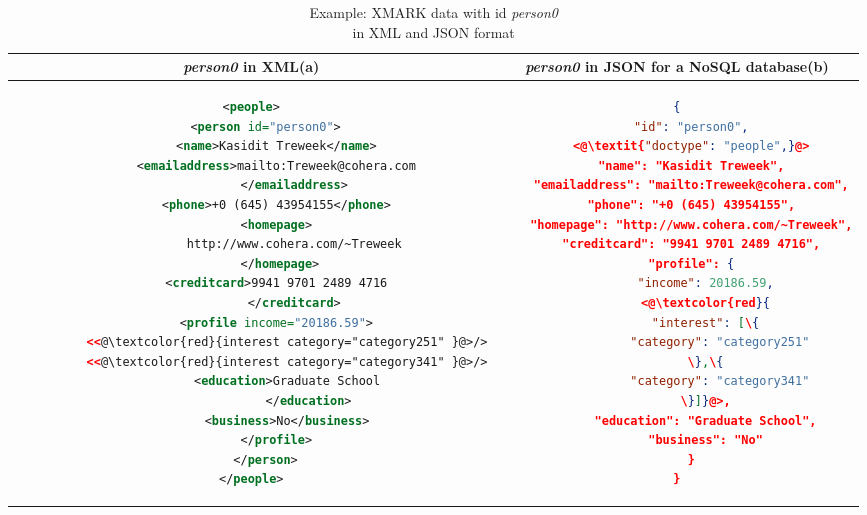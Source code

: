 \begin{longtable}{c|c}
	\caption{Example: XMARK data with id \textit{person0} \\in XML and JSON format }
	\label{tbl:xmark-xml-json}\\
	{\textit{person0}} in XML(a) & {\textit{person0}} in JSON for a NoSQL database(b)\\
	\hline
	\begin{minipage}{.4\textwidth}
\centering		
\begin{lstlisting}[language=XML,basicstyle = \tiny,label=code:xml-nosql-person0]
<people>
    <person id="person0">
       <name>Kasidit Treweek</name>
       <emailaddress>mailto:Treweek@cohera.com
            </emailaddress>
       <phone>+0 (645) 43954155</phone>
       <homepage>
            http://www.cohera.com/~Treweek
        </homepage>
       <creditcard>9941 9701 2489 4716
            </creditcard>
       <profile income="20186.59">
          <<@\textcolor{red}{interest category="category251" }@>/>
          <<@\textcolor{red}{interest category="category341" }@>/>
          <education>Graduate School
                </education>
          <business>No</business>
       </profile>
    </person>
</people>
\end{lstlisting}	
	\end{minipage} &
	\begin{minipage}{.49\textwidth}
		\centering
		\begin{lstlisting}[language=JSON, basicstyle =\tiny, label=code:json-nosql-person0, numberstyle=\tiny]
{
	"id": "person0",
	<@\textit{"doctype": "people",}@>
	"name": "Kasidit Treweek",
	"emailaddress": "mailto:Treweek@cohera.com",
	"phone": "+0 (645) 43954155",
	"homepage": "http://www.cohera.com/~Treweek",
	"creditcard": "9941 9701 2489 4716",
	"profile": {
		"income": 20186.59,
		<@\textcolor{red}{
		"interest": [\{
			"category": "category251"
		\},\{
			"category": "category341"
		\}]}@>,
		"education": "Graduate School",
		"business": "No"
	}
}
		\end{lstlisting}
	\end{minipage}\\
\end{longtable}


